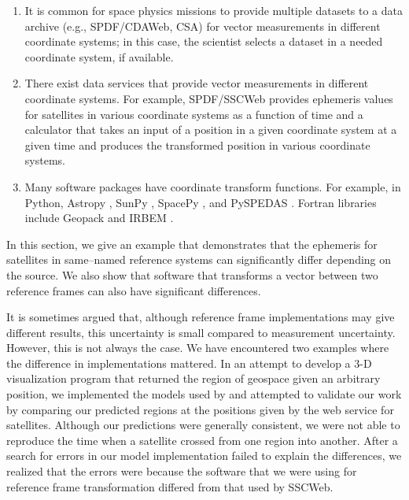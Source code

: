 \documentclass[draft]{agujournal2019}
\begin{document}
\begin{enumerate}

    \parskip 0.1in 

    \item It is common for space physics missions to provide multiple datasets to a data archive (e.g., SPDF/CDAWeb, CSA) for vector measurements in different coordinate systems; in this case, the scientist selects a dataset in a needed coordinate system, if available.

    \item There exist data services that provide vector measurements in different coordinate systems. For example, SPDF/SSCWeb provides ephemeris values for satellites in various coordinate systems as a function of time and a calculator that takes an input of a position in a given coordinate system at a given time and produces the transformed position in various coordinate systems. 

    \item Many software packages have coordinate transform functions. For example, in Python, Astropy \cite{AstroPy2022}, SunPy \cite{SunPy}, SpacePy \cite{SpacePy}, and PySPEDAS \cite{Angelopoulos2024}. Fortran libraries include Geopack \cite{Tsyganenko2008} and IRBEM \cite{IRBEM2022}.

\end{enumerate}

In this section, we give an example that demonstrates that the ephemeris for satellites in same--named reference systems can significantly differ depending on the source. We also show that software that transforms a vector between two reference frames can also have significant differences.

It is sometimes argued that, although reference frame implementations may give different results, this uncertainty is small compared to measurement uncertainty. However, this is not always the case. We have encountered two examples where the difference in implementations mattered. In an attempt to develop a 3-D visualization program that returned the region of geospace given an arbitrary position, we implemented the models used by \cite{SSCWeb} and attempted to validate our work by comparing our predicted regions at the positions given by the web service for satellites. Although our predictions were generally consistent, we were not able to reproduce the time when a satellite crossed from one region into another. After a search for errors in our model implementation failed to explain the differences, we realized that the errors were because the software that we were using for reference frame transformation differed from that used by SSCWeb.
\end{document}
